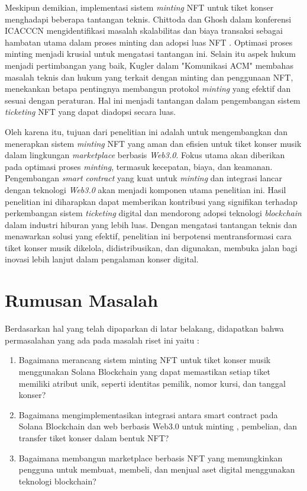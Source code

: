 Meskipun demikian, implementasi sistem \textit{minting} NFT untuk tiket konser menghadapi beberapa tantangan teknis. Chittoda dan Ghosh dalam konferensi ICACCCN mengidentifikasi masalah skalabilitas dan biaya transaksi sebagai hambatan utama dalam proses minting dan adopsi luas NFT \cite{ref6}. Optimasi proses minting menjadi krusial untuk mengatasi tantangan ini. Selain itu aspek hukum menjadi pertimbangan yang baik, Kugler dalam "Komunikasi ACM" membahas masalah teknis dan hukum yang terkait dengan minting dan penggunaan NFT, menekankan betapa pentingnya membangun protokol \textit{minting} yang efektif dan sesuai dengan peraturan\parencite{ref7}. Hal ini menjadi tantangan dalam pengembangan sistem \textit{ticketing} NFT yang dapat diadopsi secara luas. 

Oleh karena itu, tujuan dari penelitian ini adalah untuk mengembangkan dan menerapkan sistem \textit{minting} NFT yang aman dan efisien untuk tiket konser musik dalam lingkungan \textit{marketplace} berbasis \textit{Web3.0}. Fokus utama akan diberikan pada optimasi proses \textit{minting}, termasuk kecepatan, biaya, dan keamanan. Pengembangan \textit{smart contract} yang kuat untuk \textit{minting} dan integrasi lancar dengan teknologi \textit{Web3.0} akan menjadi komponen utama penelitian ini. Hasil penelitian ini diharapkan dapat memberikan kontribusi yang signifikan terhadap perkembangan sistem \textit{ticketing} digital dan mendorong adopsi teknologi \textit{blockchain} dalam industri hiburan yang lebih luas. Dengan mengatasi tantangan teknis dan menawarkan solusi yang efektif, penelitian ini berpotensi mentransformasi cara tiket konser musik dikelola, didistribusikan, dan digunakan, membuka jalan bagi inovasi lebih lanjut dalam pengalaman konser digital.

\section{Rumusan Masalah}

Berdasarkan hal yang telah dipaparkan di latar belakang, didapatkan bahwa permasalahan yang ada pada masalah riset ini yaitu :
\begin{enumerate}
    \item Bagaimana merancang sistem minting NFT untuk tiket konser musik menggunakan Solana Blockchain yang dapat memastikan setiap tiket memiliki atribut unik, seperti identitas pemilik, nomor kursi, dan tanggal konser?
    \item Bagaimana mengimplementasikan integrasi antara smart contract pada Solana Blockchain dan web berbasis Web3.0 untuk  minting , pembelian, dan transfer tiket konser dalam bentuk NFT?
    \item Bagaimana membangun marketplace berbasis NFT yang memungkinkan pengguna untuk membuat, membeli, dan menjual aset digital menggunakan teknologi blockchain?
\end{enumerate}



